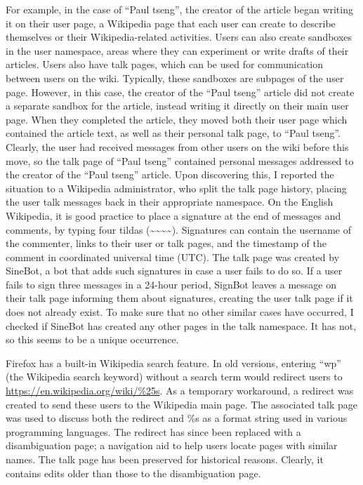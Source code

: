 \documentclass[14pt,a4paper]{report}
\begin{document}
For example, in the case of ``Paul tseng'', the creator of the article began writing it on their user page, a Wikipedia page that each user can create to describe themselves or their Wikipedia-related activities. Users can also create sandboxes in the user namespace, areas where they can experiment or write drafts of their articles. Users also have talk pages, which can be used for communication between users on the wiki. \autocite{userpage} Typically, these sandboxes are subpages of the user page. However, in this case, the creator of the ``Paul tseng'' article did not create a separate sandbox for the article, instead writing it directly on their main user page. When they completed the article, they moved both their user page which contained the article text, as well as their personal talk page, to ``Paul tseng''. Clearly, the user had received messages from other users on the wiki before this move, so the talk page of ``Paul tseng'' contained personal messages addressed to the creator of the ``Paul tseng'' article. Upon discovering this, I reported the situation to a Wikipedia administrator, who split the talk page history, placing the user talk messages back in their appropriate namespace. \autocite{paultseng} On the English Wikipedia, it is good practice to place a signature at the end of messages and comments, by typing four tildas (\textasciitilde{}\textasciitilde{}\textasciitilde{}\textasciitilde{}). \autocite{signatures} Signatures can contain the username of the commenter, links to their user or talk pages, and the timestamp of the comment in coordinated universal time (UTC). The talk page was created by SineBot, a bot that adds such signatures in case a user fails to do so. If a user fails to sign three messages in a 24-hour period, SignBot leaves a message on their talk page informing them about signatures, creating the user talk page if it does not already exist. \autocite{sinebot} To make sure that no other similar cases have occurred, I checked if SineBot has created any other pages in the talk namespace. It has not, so this seems to be a unique occurrence.

Firefox has a built-in Wikipedia search feature. In old versions, entering ``wp'' (the Wikipedia search keyword) without a search term would redirect users to \url{https://en.wikipedia.org/wiki/\%25s}. As a temporary workaround, a redirect was created to send these users to the Wikipedia main page. The associated talk page was used to discuss both the redirect and \%s as a format string used in various programming languages. \autocite{percents} The redirect has since been replaced with a disambiguation page; a navigation aid to help users locate pages with similar names. \autocite{dabdabdab} The talk page has been preserved for historical reasons. Clearly, it contains edits older than those to the disambiguation page.
\end{document}
